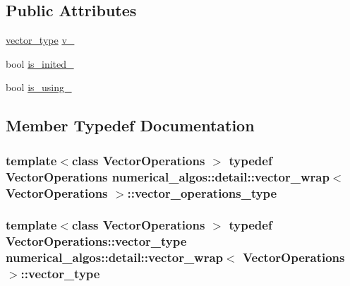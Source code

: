 \subsection*{Public Attributes}
\begin{DoxyCompactItemize}
\item 
\hyperlink{structnumerical__algos_1_1detail_1_1vector__wrap_ad1b05447249f58553a35e12c23cb3e12}{vector\-\_\-type} \hyperlink{structnumerical__algos_1_1detail_1_1vector__wrap_a70f4e662d62fb5bd7bc48067b4443c56}{v\-\_\-}
\item 
bool \hyperlink{structnumerical__algos_1_1detail_1_1vector__wrap_aaf5db6668aeed52bebc8e9679a07be72}{is\-\_\-inited\-\_\-}
\item 
bool \hyperlink{structnumerical__algos_1_1detail_1_1vector__wrap_af575530f0c10e653901eaa23b0260b99}{is\-\_\-using\-\_\-}
\end{DoxyCompactItemize}


\subsection{Member Typedef Documentation}
\hypertarget{structnumerical__algos_1_1detail_1_1vector__wrap_aec858386dcc9cf18fdedd2ab4a606217}{
\subsubsection[{vector\-\_\-operations\-\_\-type}]{\setlength{\rightskip}{0pt plus 5cm}template$<$class Vector\-Operations $>$ typedef Vector\-Operations {\bf numerical\-\_\-algos\-::detail\-::vector\-\_\-wrap}$<$ Vector\-Operations $>$\-::{\bf vector\-\_\-operations\-\_\-type}}}\label{structnumerical__algos_1_1detail_1_1vector__wrap_aec858386dcc9cf18fdedd2ab4a606217}
\hypertarget{structnumerical__algos_1_1detail_1_1vector__wrap_ad1b05447249f58553a35e12c23cb3e12}{
\subsubsection[{vector\-\_\-type}]{\setlength{\rightskip}{0pt plus 5cm}template$<$class Vector\-Operations $>$ typedef Vector\-Operations\-::vector\-\_\-type {\bf numerical\-\_\-algos\-::detail\-::vector\-\_\-wrap}$<$ Vector\-Operations $>$\-::{\bf vector\-\_\-type}}}\label{structnumerical__algos_1_1detail_1_1vector__wrap_ad1b05447249f58553a35e12c23cb3e12}


